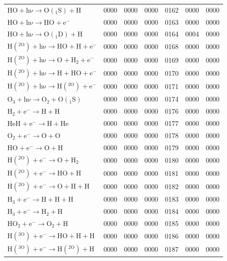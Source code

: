 \begin{longtable}{lrrrrrr}
$\mathrm{HO + h\nu \rightarrow O(_1S) + H}$ & 0000 & 0000 & 0000 & 0162 & 0000 & 0000 \\
$\mathrm{HO + h\nu \rightarrow HO^{} + e^{-}}$ & 0000 & 0000 & 0000 & 0163 & 0000 & 0000 \\
$\mathrm{HO + h\nu \rightarrow O(_1D) + H}$ & 0000 & 0000 & 0000 & 0164 & 0004 & 0000 \\
$\mathrm{H(^{2O}) + h\nu \rightarrow HO^{} + H + e^{-}}$ & 0000 & 0000 & 0000 & 0168 & 0000 & 0000 \\
$\mathrm{H(^{2O}) + h\nu \rightarrow O^{} + H_2 + e^{-}}$ & 0000 & 0000 & 0000 & 0169 & 0000 & 0000 \\
$\mathrm{H(^{2O}) + h\nu \rightarrow H^{} + HO + e^{-}}$ & 0000 & 0000 & 0000 & 0170 & 0000 & 0000 \\
$\mathrm{H(^{2O}) + h\nu \rightarrow H(^{2O})^{} + e^{-}}$ & 0000 & 0000 & 0000 & 0171 & 0000 & 0000 \\
$\mathrm{O_3 + h\nu \rightarrow O_2 + O(_1S)}$ & 0000 & 0000 & 0000 & 0174 & 0000 & 0000 \\
$\mathrm{H_2^{} + e^{-} \rightarrow H + H}$ & 0000 & 0000 & 0000 & 0176 & 0000 & 0000 \\
$\mathrm{HeH^{} + e^{-} \rightarrow H + He}$ & 0000 & 0000 & 0000 & 0177 & 0000 & 0000 \\
$\mathrm{O_2^{} + e^{-} \rightarrow O + O}$ & 0000 & 0000 & 0000 & 0178 & 0000 & 0000 \\
$\mathrm{HO^{} + e^{-} \rightarrow O + H}$ & 0000 & 0000 & 0000 & 0179 & 0000 & 0000 \\
$\mathrm{H(^{2O})^{} + e^{-} \rightarrow O + H_2}$ & 0000 & 0000 & 0000 & 0180 & 0000 & 0000 \\
$\mathrm{H(^{2O})^{} + e^{-} \rightarrow HO + H}$ & 0000 & 0000 & 0000 & 0181 & 0000 & 0000 \\
$\mathrm{H(^{2O})^{} + e^{-} \rightarrow O + H + H}$ & 0000 & 0000 & 0000 & 0182 & 0000 & 0000 \\
$\mathrm{H_3^{} + e^{-} \rightarrow H + H + H}$ & 0000 & 0000 & 0000 & 0183 & 0000 & 0000 \\
$\mathrm{H_3^{} + e^{-} \rightarrow H_2 + H}$ & 0000 & 0000 & 0000 & 0184 & 0000 & 0000 \\
$\mathrm{HO_2^{} + e^{-} \rightarrow O_2 + H}$ & 0000 & 0000 & 0000 & 0185 & 0000 & 0000 \\
$\mathrm{H(^{3O})^{} + e^{-} \rightarrow HO + H + H}$ & 0000 & 0000 & 0000 & 0186 & 0000 & 0000 \\
$\mathrm{H(^{3O})^{} + e^{-} \rightarrow H(^{2O}) + H}$ & 0000 & 0000 & 0000 & 0187 & 0000 & 0000 \\

\end{longtable}
